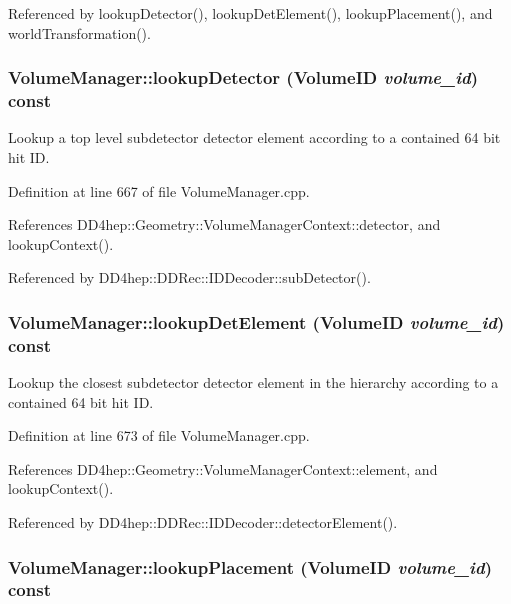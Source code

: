 Referenced by lookupDetector(), lookupDetElement(), lookupPlacement(), and worldTransformation().\hypertarget{class_d_d4hep_1_1_geometry_1_1_volume_manager_a3734beabd6ff537a641b80e79e84b93b}{
\subsubsection[{lookupDetector}]{ VolumeManager::lookupDetector ({\bf VolumeID} {\em volume\_\-id}) const}}
\label{class_d_d4hep_1_1_geometry_1_1_volume_manager_a3734beabd6ff537a641b80e79e84b93b}


Lookup a top level subdetector detector element according to a contained 64 bit hit ID. 

Definition at line 667 of file VolumeManager.cpp.

References DD4hep::Geometry::VolumeManagerContext::detector, and lookupContext().

Referenced by DD4hep::DDRec::IDDecoder::subDetector().\hypertarget{class_d_d4hep_1_1_geometry_1_1_volume_manager_a47c43ad4eda1df62d538e2adde993b78}{
\subsubsection[{lookupDetElement}]{ VolumeManager::lookupDetElement ({\bf VolumeID} {\em volume\_\-id}) const}}
\label{class_d_d4hep_1_1_geometry_1_1_volume_manager_a47c43ad4eda1df62d538e2adde993b78}


Lookup the closest subdetector detector element in the hierarchy according to a contained 64 bit hit ID. 

Definition at line 673 of file VolumeManager.cpp.

References DD4hep::Geometry::VolumeManagerContext::element, and lookupContext().

Referenced by DD4hep::DDRec::IDDecoder::detectorElement().\hypertarget{class_d_d4hep_1_1_geometry_1_1_volume_manager_a1b1dc5fd02dcae196511200f32c9e309}{
\subsubsection[{lookupPlacement}]{ VolumeManager::lookupPlacement ({\bf VolumeID} {\em volume\_\-id}) const}}
\label{class_d_d4hep_1_1_geometry_1_1_volume_manager_a1b1dc5fd02dcae196511200f32c9e309}


